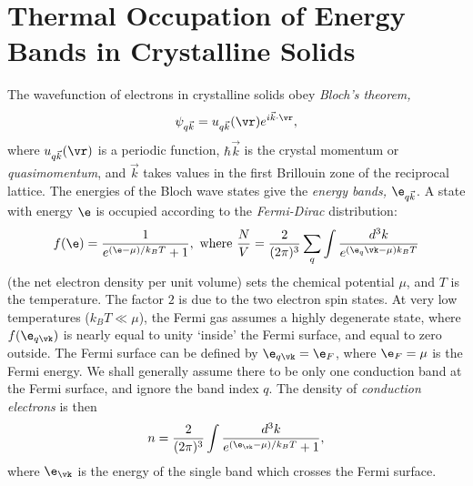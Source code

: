 \documentclass[a4paper, 11pt, normalem]{report}
\begin{document}
\section{Thermal Occupation of Energy Bands in Crystalline Solids}
The wavefunction of electrons in crystalline solids obey \emph{Bloch's theorem,}
\begin{equation}
    \psi_{q\vec{k}}=u_{q\vec{k}}(\vr)e^{i\vec{k}\cdot\vr},
\end{equation}
where $u_{q\vec{k}}(\vr)$ is a periodic function, $\hbar\vec{k}$ is the crystal momentum or \emph{quasimomentum}, and $\vec{k}$ takes values in the first Brillouin zone of the reciprocal lattice.
The energies of the Bloch wave states give the \emph{energy bands,} $\e_{q\vec{k}}$.
A state with energy $\e$ is occupied according to the \emph{Fermi-Dirac} distribution:
\begin{equation}
    f(\e) = \frac{1}{e^{(\e-\mu)/k_BT}+1}, \text{ where } \frac NV = \frac{2}{(2\pi)^3}\sum_q\int\frac{d^3k}{e^{(\e_q\vk-\mu)k_BT}}
\end{equation}
(the net electron density per unit volume) sets the chemical potential $\mu$, and $T$ is the temperature.
The factor $2$ is due to the two electron spin states.
At very low temperatures ($k_BT\ll\mu$), the Fermi gas assumes a highly degenerate state, where $f(\e_{q\vk})$ is nearly equal to unity `inside' the Fermi surface, and equal to zero outside.
The Fermi surface can be defined by $\e_{q\vk}=\e_F$, where $\e_F=\mu$ is the Fermi energy.
We shall generally assume there to be only one conduction band at the Fermi surface, and ignore the band index $q$.
The density of \emph{conduction electrons} is then
\begin{equation}
    n = \frac{2}{(2\pi)^3}\int \frac{d^3k}{e^{(\e_{\vk}-\mu)/k_BT}+1},
\end{equation}
where $\e_{\vk}$ is the energy of the single band which crosses the Fermi surface.
\end{document}
